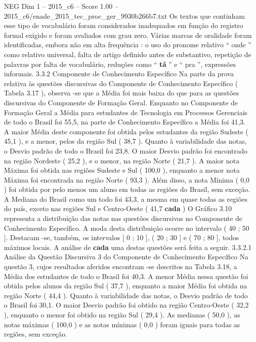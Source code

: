 \begin{textsample}{NEG Dim 1 – 2015\_c6 – Score 1.00 – 2015\_c6/enade\_2015\_tec\_proc\_ger\_9930b266b7.txt}
Os textos que continham esse tipo de vocabulário foram considerados inadequados em função do registro formal exigido e foram avaliados com grau zero.
Várias marcas de oralidade foram identificadas, embora não em alta frequência : o uso do pronome relativo “ onde ” como relativo universal, falta de artigo definido antes de substantivo, repetição de palavras por falta de vocabulário, reduções como “ \textbf{tá} ” e “ pra ”, expressões informais. 3.3.2 Componente de Conhecimento Específico Na parte da prova relativa às questões discursivas do Componente de Conhecimento Específico ( Tabela 3.17 ), observa -se que a Média foi mais baixa do que para as questões discursivas do Componente de Formação Geral.
Enquanto no Componente de Formação Geral a Média para estudantes de Tecnologia em Processos Gerenciais de todo o Brasil foi 55,5, na parte de Conhecimento Específico a Média foi 41,3.
A maior Média deste componente foi obtida pelos estudantes da região Sudeste ( 45,1 ), e a menor, pelos da região Sul ( 38,7 ).
Quanto à variabilidade das notas, o Desvio padrão de todo o Brasil foi 23,8.
O maior Desvio padrão foi encontrado na região Nordeste ( 25,2 ), e o menor, na região Norte ( 21,7 ).
A maior nota Máxima foi obtida nas regiões Sudeste e Sul ( 100,0 ), enquanto a menor nota Máxima foi encontrada na região Norte ( 93,3 ).
Além disso, a nota Mínima ( 0,0 ) foi obtida por pelo menos um aluno em todas as regiões do Brasil, sem exceção.
A Mediana do Brasil como um todo foi 43,3, a mesma em quase todas as regiões do país, exceto nas regiões Sul e Centro-Oeste ( 41,7 \textbf{cada} ) O Gráfico 3.10 representa a distribuição das notas nas questões discursivas no Componente de Conhecimento Específico.
A moda desta distribuição ocorre no intervalo ( 40 ; 50 ].
Destacam -se, também, os intervalos [ 0 ; 10 ], ( 20 ; 30 ] e ( 70 ; 80 ], todos máximos locais.
A análise de \textbf{cada} uma destas questões será feita a seguir. 3.3.2.1 Análise da Questão Discursiva 3 do Componente de Conhecimento Específico Na questão 3, cujos resultados aferidos encontram -se descritos na Tabela 3.18, a Média dos estudantes de todo o Brasil foi 40,3.
A menor Média nessa questão foi obtida pelos alunos da região Sul ( 37,7 ), enquanto a maior Média foi obtida na região Norte ( 44,4 ).
Quanto à variabilidade das notas, o Desvio padrão de todo o Brasil foi 30,1.
O maior Desvio padrão foi obtido na região Centro-Oeste ( 32,2 ), enquanto o menor foi obtido na região Sul ( 29,4 ).
As medianas ( 50,0 ), as notas máximas ( 100,0 ) e as notas mínimas ( 0,0 ) foram iguais para todas as regiões, sem exceção.

\end{textsample}
